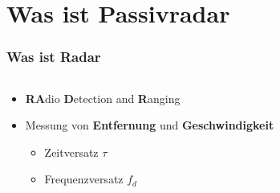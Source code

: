 \section{Was ist Passivradar}

\begin{frame}
    \frametitle{Was ist Radar}

    \begin{columns}
        \begin{column}{0.6\textwidth}
            \begin{itemize}
                \item \textbf{RA}dio \textbf{D}etection and \textbf{R}anging
                \item Messung von \textbf{Entfernung} und \textbf{Geschwindigkeit}
                      \begin{itemize}
                          \item<3-> Zeitversatz \(\tau\)
                          \item<3-> Frequenzversatz \(f_{d}\)
                      \end{itemize}
            \end{itemize}
        \end{column}
        \begin{column}{0.4\textwidth}
            \begin{figure}
                \centering
                \begin{tikzpicture}
                    
                \end{tikzpicture}
            \end{figure}
        \end{column}
    \end{columns}
\end{frame}

